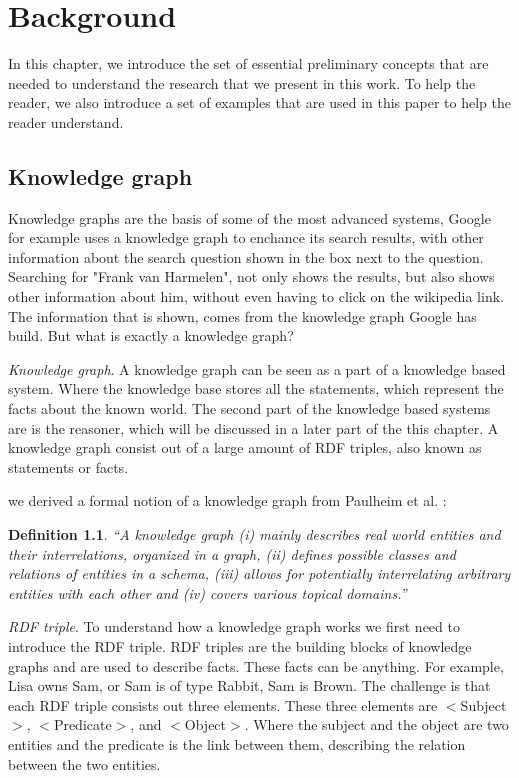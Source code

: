 \documentclass[11pt,letterpaper ,oneside ]{book}
\newtheorem{definition}{Definition}
\begin{document}
\newpage
\chapter{Background}\label{Background}
In this chapter, we introduce the set of essential preliminary concepts that are needed to understand the research that we present in this work. To help the reader, we also introduce a set of examples that are used in this paper to help the reader understand.

\section{Knowledge graph}\label{graphElements}
Knowledge graphs are the basis of some of the most advanced systems, Google for example uses a knowledge graph to enchance its search results, with other information about the search question shown in the box next to the question. Searching for "Frank van Harmelen", not only shows the results, but also shows other information about him, without even having to click on the wikipedia link. The information that is shown, comes from the knowledge graph Google has build. But what is exactly a knowledge graph?

\textit{Knowledge graph}. 
A knowledge graph can be seen as a part of a knowledge based system. Where the knowledge base stores all the statements, which represent the facts about the known world. The second part of the knowledge based systems are is the reasoner, which will be discussed in a later part of the this chapter. A knowledge graph consist out of a large amount of RDF triples, also known as statements or facts.

we derived a formal notion of a knowledge graph from Paulheim et al. \cite{HeikoP:2016}:
\begin{definition} 
	“A knowledge graph (i) mainly describes real world entities and their interrelations, organized in a graph, (ii) defines possible classes and relations of entities in a schema, (iii) allows for potentially interrelating arbitrary entities with each other and (iv) covers various topical domains.”
\end{definition}

\textit{RDF triple}. To understand how a knowledge graph works we first need to introduce the RDF triple. RDF triples are the building blocks of knowledge graphs and are used to describe facts. These facts can be anything. For example, Lisa owns Sam, or Sam is of type Rabbit, Sam is Brown.  The challenge is that each RDF triple consists out three elements.
These three elements are $<$Subject$>$, $<$Predicate$>$, and $<$Object$>$. Where the subject and the object are two entities and the predicate is the link between them, describing the relation between the two entities. 
\end{document}
